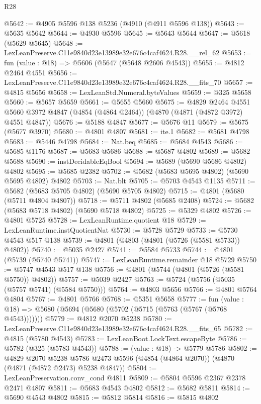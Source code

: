 \begin{lexlean}{R28}
\begin{coremodule}
@5642 := @4905 @5596 @138 @5236 (@4910 (@4911 @5596 @138))
@5643 := @5635 @5642
@5644 := @4930 @5596
@5645 := @5643 @5644
@5647 := @5618 (@5629 @5645)
@5648 := LexLeanPreserve.C11e9840d23e13989e32e676c4caf4624.R28.__rel_62
@5653 := fun (value : @18) => @5606 (@5647 (@5648 @2606 @4543))
@5655 := @4812 @2464 @4551
@5656 := LexLeanPreserve.C11e9840d23e13989e32e676c4caf4624.R28.__fits_70
@5657 := @4815 @5656
@5658 := LexLeanStd.Numeral.byteValues
@5659 := @325 @5658
@5660 := @5657 @5659
@5661 := @5655 @5660
@5675 := @4829
    @2464
    @4551
    @5660
    @3972
    @4847
    (@4854 (@4864 @2464))
    (@4870 (@4871 (@4872 @3972) @4551 @4847))
@5676 := @5188 @4847
@5677 := @5676 @11
@5679 := @5675 (@5677 @3970)
@5680 := @4801 @4807
@5681 := ite.{1}
@5682 := @5681 @4798
@5683 := @5446 @4798
@5684 := Nat.beq
@5685 := @5684 @4543
@5686 := @5685 @1176
@5687 := @5683 @5686
@5688 := @5687 @4802
@5689 := @5682 @5688
@5690 := instDecidableEqBool
@5694 := @5689 (@5690 @5686 @4802) @4802
@5695 := @5685 @2382
@5702 := @5682 (@5683 @5695 @4802) (@5690 @5695 @4802) @4802
@5703 := Nat.blt
@5705 := @5703 @4543 @1135
@5711 := @5682 (@5683 @5705 @4802) (@5690 @5705 @4802)
@5715 := @4801 (@5680 (@5711 @4804 @4807))
@5718 := @5711 @4802 (@5685 @2408)
@5724 := @5682 (@5683 @5718 @4802) (@5690 @5718 @4802)
@5725 := @5329 @4802
@5726 := @4801 @5725
@5728 := LexLeanRuntime.quotient @18
@5729 := LexLeanRuntime.instQuotientNat
@5730 := @5728 @5729
@5733 := @5730 @4543 @517 @138
@5739 := @4801 (@4803 (@4801 (@5726 (@5581 @5733)) @4802))
@5740 := @5035 @2427
@5741 := @5584 @5733
@5744 := @4801 (@5739 (@5740 @5741))
@5747 := LexLeanRuntime.remainder @18 @5729
@5750 := @5747 @4543 @517 @138
@5756 := @4801 (@5744 (@4801 (@5726 (@5581 @5750)) @4802))
@5757 := @5039 @2427
@5763 := @5724 (@5756 (@5035 (@5757 @5741) (@5584 @5750)))
@5764 := @4803 @5656
@5766 := @4801 @5764 @4804
@5767 := @4801 @5766
@5768 := @5351 @5658
@5777 := fun (value : @18) => @5680 (@5694 (@5680 (@5702 (@5715 (@5763 (@5767 (@5768 @4543)))))))
@5779 := @4812 @2070 @5238
@5780 := LexLeanPreserve.C11e9840d23e13989e32e676c4caf4624.R28.__fits_65
@5782 := @4815 (@5780 @4543)
@5783 := LexLeanBoot.LockText.escapeByte
@5786 := @5782 (@325 (@5783 @4543))
@5788 := (value : @18) -> @5779 @5786
@5802 := @4829
    @2070
    @5238
    @5786
    @2473
    @5596
    (@4854 (@4864 @2070))
    (@4870 (@4871 (@4872 @2473) @5238 @4847))
@5804 := LexLeanPreservation.conv_cond @4811
@5809 := @5804 @5596 @2367 @2378 @2471 @4807
@5811 := @5683 @4543 @4802
@5812 := @5682 @5811
@5814 := @5690 @4543 @4802
@5815 := @5812 @5814
@5816 := @5815 @4802

\end{coremodule}
\end{lexlean}

